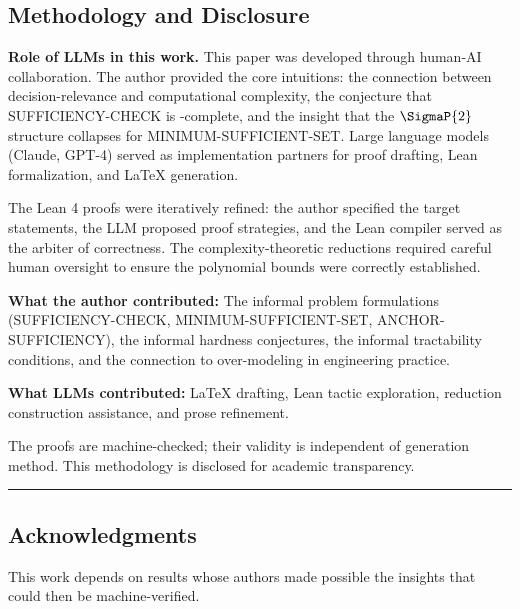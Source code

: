 \subsection*{Methodology and Disclosure}

\textbf{Role of LLMs in this work.} This paper was developed through human-AI collaboration. The author provided the core intuitions: the connection between decision-relevance and computational complexity, the conjecture that SUFFICIENCY-CHECK is \coNP-complete, and the insight that the $\SigmaP{2}$ structure collapses for MINIMUM-SUFFICIENT-SET. Large language models (Claude, GPT-4) served as implementation partners for proof drafting, Lean formalization, and \LaTeX{} generation.

The Lean 4 proofs were iteratively refined: the author specified the target statements, the LLM proposed proof strategies, and the Lean compiler served as the arbiter of correctness. The complexity-theoretic reductions required careful human oversight to ensure the polynomial bounds were correctly established.

\textbf{What the author contributed:} The informal problem formulations (SUFFICIENCY-CHECK, MINIMUM-SUFFICIENT-SET, ANCHOR-SUFFICIENCY), the informal hardness conjectures, the informal tractability conditions, and the connection to over-modeling in engineering practice.

\textbf{What LLMs contributed:} \LaTeX{} drafting, Lean tactic exploration, reduction construction assistance, and prose refinement.

The proofs are machine-checked; their validity is independent of generation method. This methodology is disclosed for academic transparency.

\begin{center}\rule{0.5\linewidth}{0.5pt}\end{center}

\subsection*{Acknowledgments}

This work depends on results whose authors made possible the insights that could then be machine-verified.

